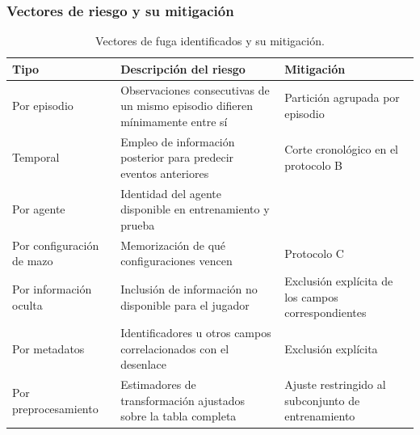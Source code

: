 
\subsubsection{Vectores de riesgo y su mitigación}

\begin{table}[!t]
\centering
\caption{Vectores de fuga identificados y su mitigación.}
\label{tab:leakage}
\footnotesize
\begin{tabularx}{\columnwidth}{@{}P{1.8cm} Y P{2.0cm}@{}}
\toprule
\textbf{Tipo} & \textbf{Descripción del riesgo} &
\textbf{Mitigación}\\
\midrule
Por episodio & Observaciones consecutivas de un mismo episodio difieren
mínimamente entre sí & Partición agrupada por episodio\\[2pt]
Temporal & Empleo de información posterior para predecir eventos
anteriores & Corte cronológico en el protocolo B\\[2pt]
Por agente & Identidad del agente disponible en entrenamiento y prueba &
\\[2pt]
Por configuración de mazo & Memorización de qué configuraciones vencen &
Protocolo C\\[2pt]
Por información oculta & Inclusión de información no disponible para el
jugador & Exclusión explícita de los campos correspondientes\\[2pt]
Por metadatos & Identificadores u otros campos correlacionados con el
desenlace & Exclusión explícita\\[2pt]
Por preprocesamiento & Estimadores de transformación ajustados sobre la
tabla completa & Ajuste restringido al subconjunto de entrenamiento\\
\bottomrule
\end{tabularx}
\end{table}



